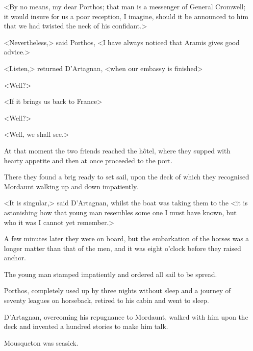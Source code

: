 <By no means, my dear Porthos; that man is a messenger of General Cromwell; it would insure for us a poor reception, I imagine, should it be announced to him that we had twisted the neck of his confidant.>

<Nevertheless,> said Porthos, <I have always noticed that Aramis gives good advice.>

<Listen,> returned D'Artagnan, <when our embassy is finished\longdash>

<Well?>

<If it brings us back to France\longdash>

<Well?>

<Well, we shall see.>

At that moment the two friends reached the hôtel,  where they supped with hearty appetite and then at once proceeded to the port.

There they found a brig ready to set sail, upon the deck of which they recognised Mordaunt walking up and down impatiently.

<It is singular,> said D'Artagnan, whilst the boat was taking them to the  <it is astonishing how that young man resembles some one I must have known, but who it was I cannot yet remember.>

A few minutes later they were on board, but the embarkation of the horses was a longer matter than that of the men, and it was eight o'clock before they raised anchor.

The young man stamped impatiently and ordered all sail to be spread.

Porthos, completely used up by three nights without sleep and a journey of seventy leagues on horseback, retired to his cabin and went to sleep.

D'Artagnan, overcoming his repugnance to Mordaunt, walked with him upon the deck and invented a hundred stories to make him talk.

Mousqueton was seasick.